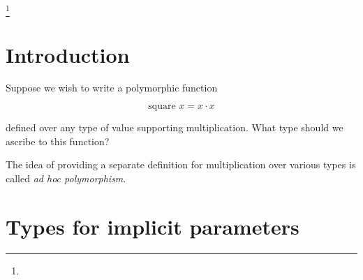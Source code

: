 \documentclass[acmlarge]{acmart}
\begin{document}
\newcommand\tmono{\tau}
\newcommand\tpoly{\sigma}
\newcommand\tvarempty{\epsilon_{\tpoly}}
\newcommand\tvar{\alpha}
\newcommand\tarrow[2]{#1 \rightarrow #2}
\newcommand\tforall[3]{\forall #1 \ . \ #2 \Rightarrow #3}
\newcommand\tgen[3]{\text{gen}\parens{#1, #2, #3}}
\newcommand\tinst[1]{\text{inst}(#1)}
\newcommand\tmgu[2]{\text{mgu}\parens{#1, #2}}

\newcommand\gcontext{\Gamma}
\newcommand\gempty{\epsilon_{\gcontext}}
\newcommand\gconcat[2]{#1, #2}

\newcommand\icontext{\Delta}
\newcommand\iempty{\epsilon_{\icontext}}
\newcommand\iconcat[2]{#1, #2}

\newcommand\ssub{\theta}
\newcommand\sempty{\epsilon_{\ssub}}
\newcommand\sub[3]{#1 \left[ #2 \mapsto #3 \right]}
\newcommand\slub[2]{#1 \vee #2}

\newcommand\utrans[2]{#1 \leadsto #2}
\newcommand\uelab[2]{#1 \hookrightarrow #2}
\newcommand\utovar[1]{\| #1 \|}



\terms{}



\thanks{
}


\maketitle

\section{Introduction}

  Suppose we wish to write a polymorphic function

  \[ \text{square } x = x \cdot x \]

  \noindent defined over any type of value supporting multiplication. What type should we ascribe to this function?

  The idea of providing a separate definition for multiplication over various types is called \emph{ad hoc polymorphism}.

\section{Types for implicit parameters}
\end{document}
